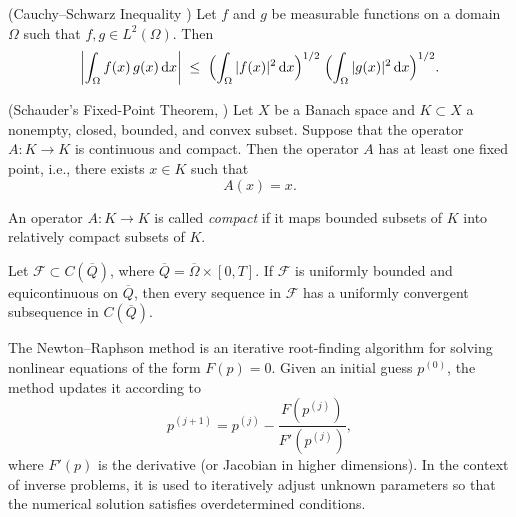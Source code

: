 \documentclass[reqno]{amsart}
\begin{document}
\begin{lemma}\label{lemma3}(Cauchy–Schwarz Inequality  \cite[p.~624]{Evans2010})
Let \(f\) and \(g\) be measurable functions on a domain \(\Omega\) such that \(f,g\in L^2(\Omega)\).  Then
\[
\left|\int_\Omega f(x)\,g(x)\,\mathrm{d}x\right|
\;\le\;
\Bigl(\int_\Omega |f(x)|^2\,\mathrm{d}x\Bigr)^{1/2}
\;\Bigl(\int_\Omega |g(x)|^2\,\mathrm{d}x\Bigr)^{1/2}.
\]
\end{lemma}


\begin{theorem}\label{thm:schauder}(Schauder’s Fixed-Point Theorem, \cite{Zeidler86})
Let \( X \) be a Banach space and \( K \subset X \) a nonempty, closed, bounded, and convex subset. Suppose that the operator \( A : K \rightarrow K \) is continuous and compact. Then the operator \( A \) has at least one fixed point, i.e., there exists \( x \in K \) such that
\[
A(x) = x.
\]
\end{theorem}
\begin{remark}
An operator \( A : K \rightarrow K \) is called \textit{compact} if it maps bounded subsets of \( K \) into relatively compact subsets of \( K \). 
\end{remark}

\begin{theorem}
Let \( \mathcal{F} \subset C(\overline{Q}) \), where \( \overline{Q} = \overline{\Omega} \times [0,T] \). If \( \mathcal{F} \) is uniformly bounded and equicontinuous on \( \overline{Q} \), then every sequence in \( \mathcal{F} \) has a uniformly convergent subsequence in \( C(\overline{Q}) \).
\end{theorem}

\begin{definition}
The Newton–Raphson method is an iterative root-finding algorithm for solving nonlinear equations of the form \( F(p) = 0 \). Given an initial guess \( p^{(0)} \), the method updates it according to
\[
p^{(j+1)} = p^{(j)} - \frac{F(p^{(j)})}{F'(p^{(j)})},
\]
where \( F'(p) \) is the derivative (or Jacobian in higher dimensions). In the context of inverse problems, it is used to iteratively adjust unknown parameters so that the numerical solution satisfies overdetermined conditions.
\end{definition}
\end{document}
